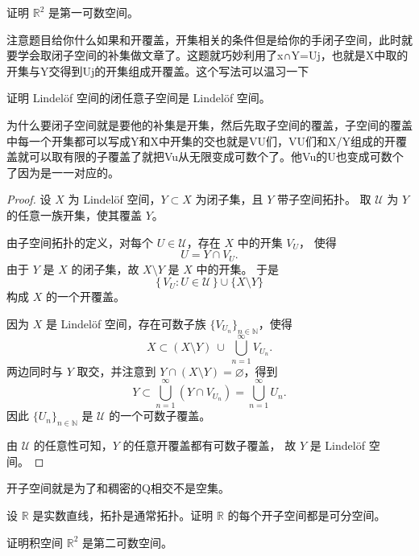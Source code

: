 \begin{homework}[第 9 题]
证明 $\mathbb{R}^2$ 是第一可数空间。
\end{homework}
\begin{dxtips}
    注意题目给你什么如果和开覆盖，开集相关的条件但是给你的手闭子空间，此时就要学会取闭子空间的补集做文章了。这题就巧妙利用了x∩Y=Uj，也就是X中取的开集与Y交得到Uj的开集组成开覆盖。这个写法可以温习一下
\end{dxtips}
\begin{homework}[10]
证明 Lindelöf 空间的闭任意子空间是 Lindelöf 空间。
\end{homework}
\begin{dxtips}
    为什么要闭子空间就是要他的补集是开集，然后先取子空间的覆盖，子空间的覆盖中每一个开集都可以写成Y和X中开集的交也就是VU们，VU们和X/Y组成的开覆盖就可以取有限的子覆盖了就把Vu从无限变成可数个了。他Vu的U也变成可数个了因为是一一对应的。
\end{dxtips}

\begin{proof}
设 $X$ 为 Lindel\"of 空间，$Y\subset X$ 为闭子集，且 $Y$ 带子空间拓扑。
取 $\mathcal U$ 为 $Y$ 的任意一族开集，使其覆盖 $Y$。

由子空间拓扑的定义，对每个 $U\in\mathcal U$，存在 $X$ 中的开集 $V_U$，
使得
\[
U = Y \cap V_U.
\]
由于 $Y$ 是 $X$ 的闭子集，故 $X\setminus Y$ 是 $X$ 中的开集。
于是
\[
\{\,V_U : U\in\mathcal U\,\}\cup\{X\setminus Y\}
\]
构成 $X$ 的一个开覆盖。

因为 $X$ 是 Lindel\"of 空间，存在可数子族
$\{V_{U_n}\}_{n\in\mathbb N}$，使得
\[
X \subset (X\setminus Y)\ \cup\ \bigcup_{n=1}^{\infty} V_{U_n}.
\]
两边同时与 $Y$ 取交，并注意到 $Y\cap(X\setminus Y)=\varnothing$，得到
\[
Y \subset \bigcup_{n=1}^{\infty} (Y\cap V_{U_n})
= \bigcup_{n=1}^{\infty} U_n.
\]
因此 $\{U_n\}_{n\in\mathbb N}$ 是 $\mathcal U$ 的一个可数子覆盖。

由 $\mathcal U$ 的任意性可知，$Y$ 的任意开覆盖都有可数子覆盖，
故 $Y$ 是 Lindel\"of 空间。
\end{proof}
\begin{dxtips}
    开子空间就是为了和稠密的Q相交不是空集。
\end{dxtips}
\begin{homework}[11]
设 $\mathbb{R}$ 是实数直线，拓扑是通常拓扑。证明 $\mathbb{R}$ 的每个开子空间都是可分空间。
\end{homework}

\begin{homework}[12]
证明积空间 $\mathbb{R}^2$ 是第二可数空间。
\end{homework}
